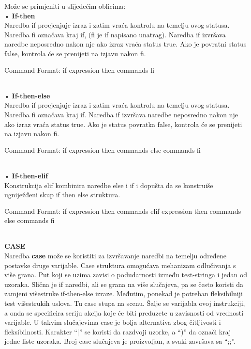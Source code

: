 \documentclass[11pt]{book}
\begin{document}
Može se primjeniti u slijedećim oblicima:\\

•	\textbf{If-then}\\

Naredba if procjenjuje izraz i zatim vraća kontrolu na temelju ovog statusa. Naredba fi označava kraj if, (fi je if napisano unatrag). Naredba if izvršava naredbe neposredno nakon nje ako izraz vraća status true. Ako je povratni status false, kontrola će se prenijeti na izjavu nakon fi.\\

\begin{shortlisting}
Command Format:  if expression
                    then  commands
                 fi
\end{shortlisting}\\

•	\textbf{If-then-else}\\

Naredba if procjenjuje izraz i zatim vraća kontrolu na temelju ovog statusa. Naredba fi označava kraj if. Naredba if izvršava naredbe neposredno nakon nje ako izraz vraća status true. Ako je status povratka false, kontrola će se prenijeti na izjavu nakon fi.\\

\begin{shortlisting}
Command Format:  if expression
                    then commands
                    else commands
                 fi
\end{shortlisting}\\

•	\textbf{If-then-elif}\\

Konstrukcija elif kombinira naredbe else i if i dopušta da se konstruiše ugniježđeni skup if then else struktura.\\

\begin{shortlisting}
Command Format:  if expression
                        then commands
                     elif expression
                        then commands
                        else commands
                   fi
\end{shortlisting}\\


\textbf{CASE}\\

Naredba \textbf{case} može se koristiti za izvršavanje naredbi na temelju određene postavke druge varijable. 
Case struktura omogućava mehanizam odlučivanja s više grana. Put koji se uzima zavisi o podudarnosti između test-stringa i jedan od uzoraka. Slična je if naredbi, ali se grana na više slučajeva, pa se često koristi da zamjeni višestruke if‐then‐else izraze. Međutim, ponekad je potreban fleksibilniji test višestrukih uslova. Tu case stupa na scenu. Šalje se varijabla ovoj instrukciji, a onda se specificira seriju akcija koje će biti preduzete u zavisnosti od vrednosti varijable. U takvim slučajevima case je bolja alternativa zbog čitljivosti i fleksibilnosti. Karakter “|” se koristi da razdvoji uzorke, a “)” da označi kraj jedne liste uzoraka. Broj
case slučajeva je proizvoljan, a svaki završava sa “;;”.\\
\end{document}
